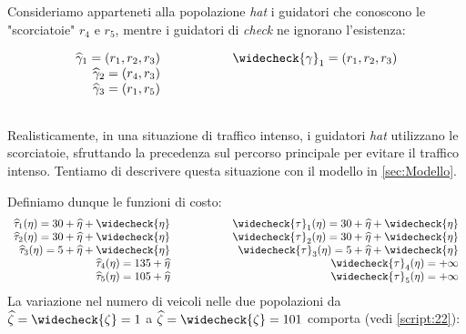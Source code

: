 Consideriamo apparteneti alla popolazione \textit{hat} i guidatori che conoscono le "scorciatoie" $r_4$ e $r_5$, mentre i guidatori di \textit{check} ne ignorano l'esistenza:

\begin{equation*}
\begin{array}{r @{\hspace{2cm}} r}

\widehat{\gamma}_1 = (r_1, r_2, r_3) &
\widecheck{\gamma}_1 = (r_1, r_2, r_3)\\

\widehat{\gamma}_2 = (r_4, r_3) & \\

\widehat{\gamma}_3 = (r_1, r_5) & \\
$$
\end{array}
\end{equation*}

Realisticamente, in una situazione di traffico intenso, i guidatori \textit{hat} utilizzano le scorciatoie, sfruttando la precedenza
sul percorso principale per evitare il traffico intenso. Tentiamo di descrivere questa situazione con il modello in \autoref{sec:Modello}.

Definiamo dunque le funzioni di costo:
\begin{equation}
\begin{array}{r @{\hspace{2cm}} r}

\widehat{\tau}_1(\eta) = 30+\widehat{\eta}+\widecheck{\eta} &
\widecheck{\tau}_1(\eta) = 30+\widehat{\eta}+\widecheck{\eta} \\

\widehat{\tau}_2(\eta) = 30+\widehat{\eta}+\widecheck{\eta} &
\widecheck{\tau}_2(\eta) = 30+\widehat{\eta}+\widecheck{\eta} \\

\widehat{\tau}_3(\eta) = 5+\widehat{\eta}+\widecheck{\eta} &
\widecheck{\tau}_3(\eta) = 5+\widehat{\eta}+\widecheck{\eta} \\

\widehat{\tau}_4(\eta) = 135+\widehat{\eta} &
\widecheck{\tau}_4(\eta) =  +\infty\\

\widehat{\tau}_5(\eta) = 105+\widehat{\eta} &
\widecheck{\tau}_5(\eta) = +\infty 
$$
\end{array}
\label{eq:13}
\end{equation}
La variazione nel numero di veicoli nelle due popolazioni da $\widehat{\zeta} = \widecheck{\zeta} = 1$ a $\widehat{\zeta} = \widecheck{\zeta} = 101$ comporta (vedi \autoref{script:22}):

